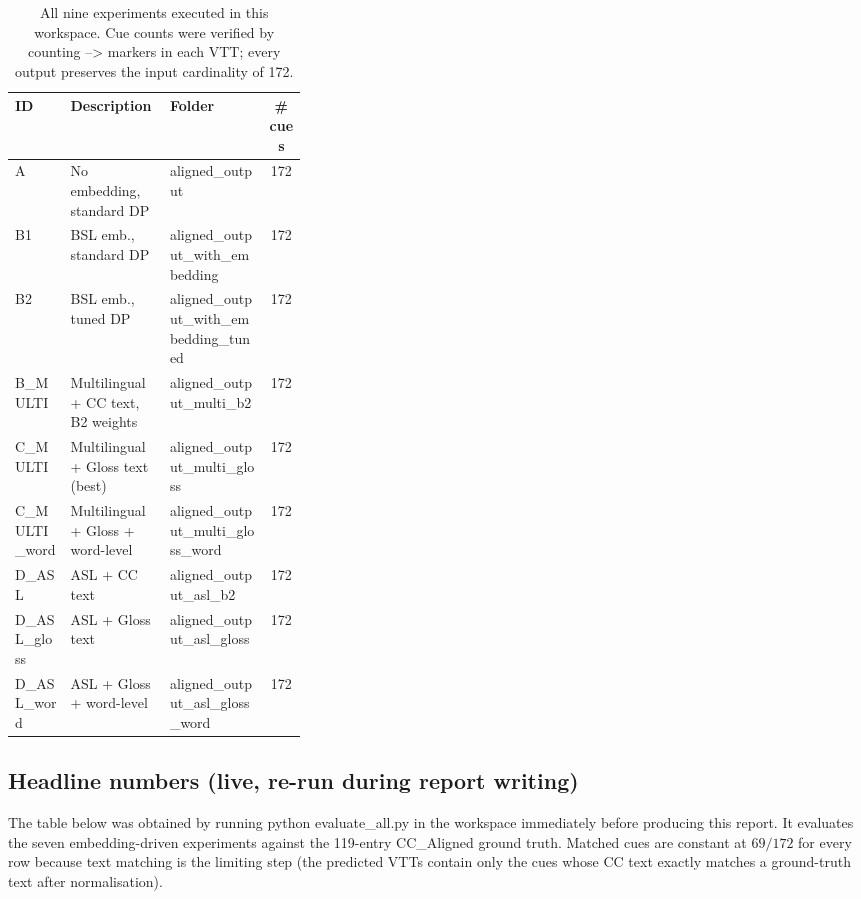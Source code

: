 \documentclass[11pt,a4paper]{article}
\def\texttt#1{#1}%
\def\textbf#1{#1}%
\def\emph#1{#1}%
\begin{document}
\begin{table}[h]
\centering
\small
\small
\begin{tabularx}{\linewidth}{@{}l p{0.34\linewidth}
                              >{\raggedright\arraybackslash}X
                              c@{}}
\toprule
\textbf{ID} & \textbf{Description} & \textbf{Folder} & \textbf{\# cues} \\
\midrule
A                 & No embedding, standard DP                   & \texttt{aligned\_output}                         & 172 \\
B1                & BSL emb., standard DP                       & \texttt{aligned\_output\_with\_embedding}        & 172 \\
B2                & BSL emb., \emph{tuned} DP                   & \texttt{aligned\_output\_with\_embedding\_tuned} & 172 \\
B\_MULTI          & Multilingual + CC text, B2 weights          & \texttt{aligned\_output\_multi\_b2}              & 172 \\
\textbf{C\_MULTI} & \textbf{Multilingual + Gloss text (best)}   & \texttt{aligned\_output\_multi\_gloss}           & 172 \\
C\_MULTI\_word    & Multilingual + Gloss + word-level           & \texttt{aligned\_output\_multi\_gloss\_word}     & 172 \\
D\_ASL            & ASL + CC text                               & \texttt{aligned\_output\_asl\_b2}                & 172 \\
D\_ASL\_gloss     & ASL + Gloss text                            & \texttt{aligned\_output\_asl\_gloss}             & 172 \\
D\_ASL\_word      & ASL + Gloss + word-level                    & \texttt{aligned\_output\_asl\_gloss\_word}       & 172 \\
\bottomrule
\end{tabularx}
\caption{All nine experiments executed in this workspace. Cue counts were
verified by counting \texttt{-->} markers in each VTT; every output preserves
the input cardinality of 172.}
\label{tab:exp-list}
\end{table}

\subsection{Headline numbers (live, re-run during report writing)}
\label{sec:live-numbers}

The table below was obtained by running
\texttt{python evaluate\_all.py} in the workspace immediately before
producing this report. It evaluates the seven embedding-driven experiments
against the 119-entry \texttt{CC\_Aligned} ground truth. Matched cues are
constant at $69/172$ for every row because text matching is the limiting
step (the predicted VTTs contain only the cues whose CC text exactly matches
a ground-truth text after normalisation).
\end{document}
